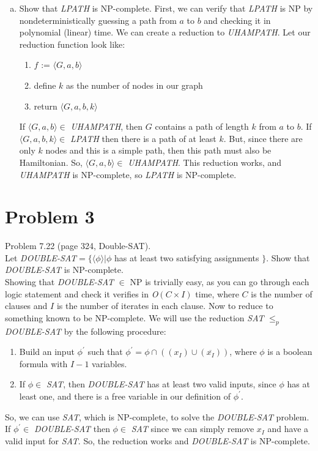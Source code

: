 \documentclass[11pt]{article}
\begin{document}
\begin{enumerate}[(a)]
    \item Show that {\em LPATH} is NP-complete.
    First, we can verify that {\em LPATH} is NP by nondeterministically guessing a path from $a$ to $b$ and checking it in polynomial (linear) time. We can create a reduction to {\em UHAMPATH}. Let our reduction function look like: 
\begin{enumerate}
    \item $f$ := $\langle G,a,b \rangle$ 
    \item define $k$ as the number of nodes in our graph
    \item return $\langle G, a, b, k \rangle$
\end{enumerate}
If $\langle G,a,b \rangle \in$ {\em UHAMPATH}, then $G$ contains a path of length $k$ from $a$ to $b$. If $\langle G, a, b, k \rangle \in$ {\em LPATH} then there is a path of at least $k$. But, since there are only $k$ nodes and this is a simple path, then this path must also be Hamiltonian. So,  $\langle G,a,b \rangle \in$ {\em UHAMPATH}. This reduction works, and {\em UHAMPATH} is NP-complete, so {\em LPATH} is NP-complete. 

\end{enumerate}

\newpage





\section*{Problem 3}

Problem 7.22 (page 324, Double-SAT).\\

Let {\em DOUBLE-SAT}$=\{\langle \phi \rangle | \phi$ has at least two satisfying assignments $\}$. Show that {\em DOUBLE-SAT} is NP-complete.\\

Showing that {\em DOUBLE-SAT} $\in$ NP is trivially easy, as you can go through each logic statement and check it verifies in {\em O}$(C\times I)$ time, where $C$ is the number of clauses and $I$ is the number of iterates in each clause. Now to reduce to something known to be NP-complete. We will use the reduction {\em SAT} $\leq_p$ {\em DOUBLE-SAT} by the following procedure:
\begin{enumerate}
    \item Build an input $\phi^\prime$ such that $\phi^\prime = \phi \cap ((x_{I})\cup (\overline{x_{I}}))$, where $\phi$ is a boolean formula with $I-1$ variables.
    \item If $\phi \in$  {\em SAT}, then {\em DOUBLE-SAT} has at least two valid inputs, since $\phi$ has at least one, and there is a free variable in our definition of $\phi^\prime$.
\end{enumerate}
So, we can use {\em SAT}, which is NP-complete, to solve the {\em DOUBLE-SAT} problem. If $\phi^\prime \in$ {\em DOUBLE-SAT} then $\phi \in$ {\em SAT} since we can simply remove $x_I$ and have a valid input for {\em SAT}.  So, the reduction works and {\em DOUBLE-SAT} is NP-complete.
\end{document}
